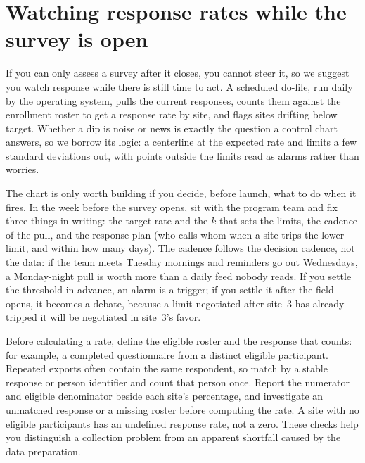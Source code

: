 \documentclass[
    a4paper,
    fontsize=10pt,
    twoside=true,
    numbers=noenddot,
]{kaobook}
\begin{document}
\section{Watching response rates while the survey is open}\label{sec:monitor}
If you can only assess a survey after it closes, you cannot steer it, so we suggest you watch response while there is still time to act. A scheduled do-file, run daily by the operating system, pulls the current responses, counts them against the enrollment roster to get a response rate by site, and flags sites drifting below target. Whether a dip is noise or news is exactly the question a control chart answers, so we borrow its logic: a centerline at the expected rate and limits a few standard deviations out, with points outside the limits read as alarms rather than worries.

The chart is only worth building if you decide, before launch, what to do when it fires. In the week before the survey opens, sit with the program team and fix three things in writing: the target rate and the $k$ that sets the limits, the cadence of the pull, and the response plan (who calls whom when a site trips the lower limit, and within how many days). The cadence follows the decision cadence, not the data: if the team meets Tuesday mornings and reminders go out Wednesdays, a Monday-night pull is worth more than a daily feed nobody reads. If you settle the threshold in advance, an alarm is a trigger; if you settle it after the field opens, it becomes a debate, because a limit negotiated after site~3 has already tripped it will be negotiated in site~3's favor.

Before calculating a rate, define the eligible roster and the response that counts: for example, a completed questionnaire from a distinct eligible participant. Repeated exports often contain the same respondent, so match by a stable response or person identifier and count that person once. Report the numerator and eligible denominator beside each site's percentage, and investigate an unmatched response or a missing roster before computing the rate. A site with no eligible participants has an undefined response rate, not a zero. These checks help you distinguish a collection problem from an apparent shortfall caused by the data preparation.
\end{document}
